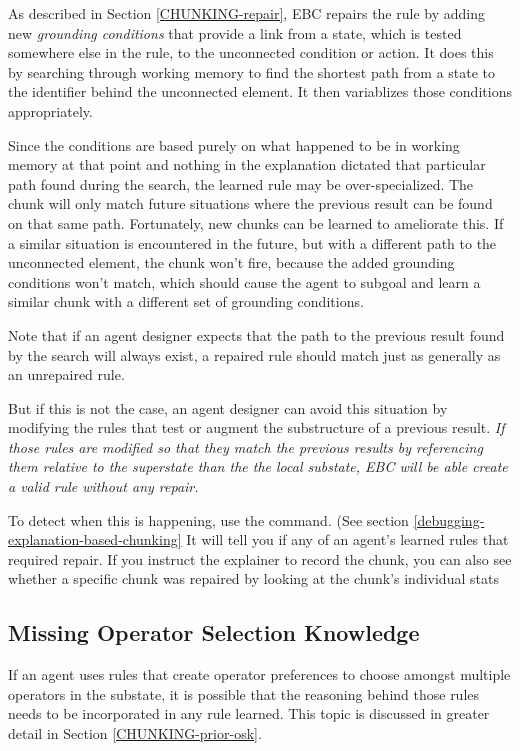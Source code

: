 As described in Section \ref{CHUNKING-repair}, EBC repairs the rule by adding new  \textit{grounding conditions} that provide a link from a state, which is tested somewhere else in the rule, to the unconnected condition or action. It does this by searching through working memory to find the shortest path from a state to the identifier behind the unconnected element.  It then variablizes those conditions appropriately.   

Since the conditions are based purely on what happened to be in working memory at that point and nothing in the explanation dictated that particular path found during the search, the learned rule may be over-specialized.  The chunk will only match future situations where the previous result can be found on that same path.  Fortunately, new chunks can be learned to ameliorate this.  If a similar situation is encountered in the future, but with a different path to the unconnected element, the chunk won't fire, because the added grounding conditions won't match, which should cause the agent to subgoal and learn a similar chunk with a different set of grounding conditions.

Note that if an agent designer expects that the path to the previous result found by the search will always exist, a repaired rule should match just as generally as an unrepaired rule.

But if this is not the case, an agent designer can avoid this situation by modifying the rules that test or augment the substructure of a previous result.  \emph{If those rules are modified so that they match the previous results by referencing them relative to the superstate than the the local substate, EBC will be able create a valid rule without any repair.}

To detect when this is happening, use the  command. (See section \ref{debugging-explanation-based-chunking} It will tell you if any of an agent's learned rules that required repair.  If you instruct the explainer to record the chunk, you can also see whether a specific chunk was repaired by looking at the chunk's individual stats

\subsection{Missing Operator Selection Knowledge}

If an agent uses rules that create operator preferences to choose amongst multiple operators in the substate, it is possible that the reasoning behind those rules needs to be incorporated in any rule learned.  This topic is discussed in greater detail in Section \ref{CHUNKING-prior-osk}.  

